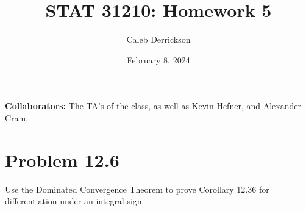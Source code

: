 

\title{STAT 31210: Homework 5}
\author{Caleb Derrickson}
\date{February 8, 2024}


\onehalfspacing
\maketitle
\allowdisplaybreaks
{\color{cit}\vspace{2mm}\noindent\textbf{Collaborators:}} The TA's of the class, as well as Kevin Hefner, and Alexander Cram.

\tableofcontents

\newpage
\section{Problem 12.6}
Use the Dominated Convergence Theorem to prove Corollary 12.36 for differentiation under an integral sign. 
\partbreak
